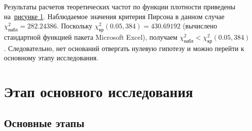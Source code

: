 \documentclass[a4paper,fontsize=14pt]{article}
\begin{document}
Результаты расчетов теоретических частот по функции плотности приведены на~\hyperref[image1]{рисунке 1}. Наблюдаемое значения критерия Пирсона в данном случае $\chi_{\text{набл}}^2 = 282.24386$. Поскольку $\chi_{\text{кр}}^2(0.05, 384) = 430.69192$ (вычислено стандартной функцией пакета Microsoft Excel), получаем $\chi_{\text{набл}}^2 < \chi_{\text{кр}}^2(0.05, 384)$. Следовательно, нет оснований отвергать нулевую гипотезу и можно перейти к основному этапу исследования.

\section{Этап основного исследования} \label{sec:analysis_part_2}

\subsection{Основные этапы} \label{subsec:analysis_part_2_intro}
\end{document}
